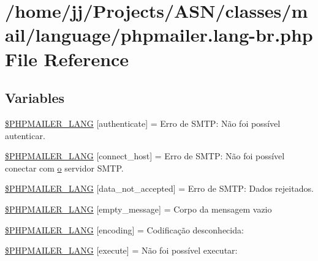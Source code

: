\hypertarget{phpmailer_8lang-br_8php}{}\section{/home/jj/\+Projects/\+A\+S\+N/classes/mail/language/phpmailer.lang-\/br.php File Reference}
\label{phpmailer_8lang-br_8php}
\subsection*{Variables}
\begin{DoxyCompactItemize}
\item 
\hyperlink{phpmailer_8lang-br_8php_a2cb33073c989b85580748e331ed8b4aa}{\$\+P\+H\+P\+M\+A\+I\+L\+E\+R\+\_\+\+L\+A\+NG} \mbox{[}\textquotesingle{}authenticate\textquotesingle{}\mbox{]} = \textquotesingle{}Erro de S\+M\+T\+P\+: Não foi possível autenticar.\textquotesingle{}
\item 
\hyperlink{phpmailer_8lang-br_8php_a2ee0cc637a06b96e45600db31c6799ee}{\$\+P\+H\+P\+M\+A\+I\+L\+E\+R\+\_\+\+L\+A\+NG} \mbox{[}\textquotesingle{}connect\+\_\+host\textquotesingle{}\mbox{]} = \textquotesingle{}Erro de S\+M\+T\+P\+: Não foi possível conectar com \hyperlink{fullpage_2plugin_8min_8js_a4afc7c854f61c136d7bcfa8997651b88}{o} servidor S\+M\+T\+P.\textquotesingle{}
\item 
\hyperlink{phpmailer_8lang-br_8php_a814c6b191205d2361b3233e9c9d6fda5}{\$\+P\+H\+P\+M\+A\+I\+L\+E\+R\+\_\+\+L\+A\+NG} \mbox{[}\textquotesingle{}data\+\_\+not\+\_\+accepted\textquotesingle{}\mbox{]} = \textquotesingle{}Erro de S\+M\+T\+P\+: Dados rejeitados.\textquotesingle{}
\item 
\hyperlink{phpmailer_8lang-br_8php_a33772099f637c9d6c2cd7425e0e37fed}{\$\+P\+H\+P\+M\+A\+I\+L\+E\+R\+\_\+\+L\+A\+NG} \mbox{[}\textquotesingle{}empty\+\_\+message\textquotesingle{}\mbox{]} = \textquotesingle{}Corpo da mensagem vazio\textquotesingle{}
\item 
\hyperlink{phpmailer_8lang-br_8php_a817f7283f3d54c970a0c10305cc668cc}{\$\+P\+H\+P\+M\+A\+I\+L\+E\+R\+\_\+\+L\+A\+NG} \mbox{[}\textquotesingle{}encoding\textquotesingle{}\mbox{]} = \textquotesingle{}Codificação desconhecida\+: \textquotesingle{}
\item 
\hyperlink{phpmailer_8lang-br_8php_a668217a9563a168f30f2a8548b6ed5a9}{\$\+P\+H\+P\+M\+A\+I\+L\+E\+R\+\_\+\+L\+A\+NG} \mbox{[}\textquotesingle{}execute\textquotesingle{}\mbox{]} = \textquotesingle{}Não foi possível executar\+: \textquotesingle{}

\end{DoxyCompactItemize}
